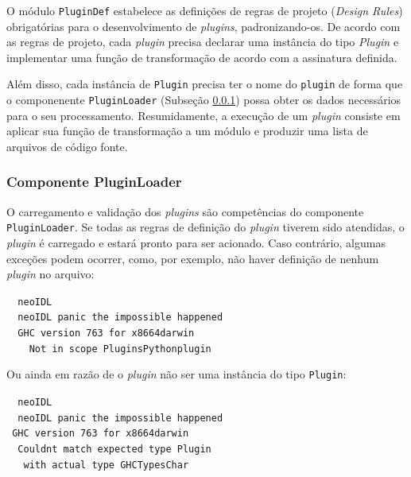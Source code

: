 O módulo \texttt{PluginDef} estabelece as definições de regras de projeto
(\textit{Design Rules}) obrigatórias para o desenvolvimento de
\textit{plugins}, padronizando-os. De acordo com as regras de projeto, cada
\textit{plugin} precisa declarar uma instância do tipo \emph{Plugin} e implementar uma função de
transformação de acordo com a assinatura definida.

Além disso, cada instância de  
\texttt{Plugin} precisa ter o nome do \texttt{plugin} de forma que o
componenente \texttt{PluginLoader} (Subseção \ref{compPluginLoader}) possa obter
os dados necessários para o seu processamento.
Resumidamente, a execução de um \textit{plugin} consiste em aplicar sua função
de transformação a um módulo \neoidl{} e produzir uma lista de
arquivos de código fonte. 


\subsubsection{Componente PluginLoader}
\label{compPluginLoader}

O carregamento e validação dos \textit{plugins} são competências do componente
\texttt{PluginLoader}. Se todas as regras de definição do \textit{plugin}
tiverem sido atendidas, o \textit{plugin} é carregado e estará pronto para ser
 acionado. Caso contrário, algumas exceções podem ocorrer, como, por exemplo, não haver definição de
nenhum \textit{plugin} no arquivo:
\vspace{-6mm}

\begin{tabbing}\tt
~neoIDL\\
\tt
~neoIDL~panic~the~impossible~happened\\
\tt ~~GHC~version~763~for~x8664darwin\\
\tt ~~~~Not~in~scope~PluginsPythonplugin
\end{tabbing}
\vspace{-6mm}

Ou ainda em razão de o \textit{plugin} não ser uma instância do tipo
\texttt{Plugin}:

\vspace{-6mm}
\begin{tabbing}\tt
~neoIDL\\
\tt
~neoIDL~panic~the~impossible~happened\\
\tt ~GHC~version~763~for~x8664darwin\\
\tt ~~Couldnt~match~expected~type~Plugin\\
\tt ~~~with~actual~type~GHCTypesChar
\end{tabbing}


